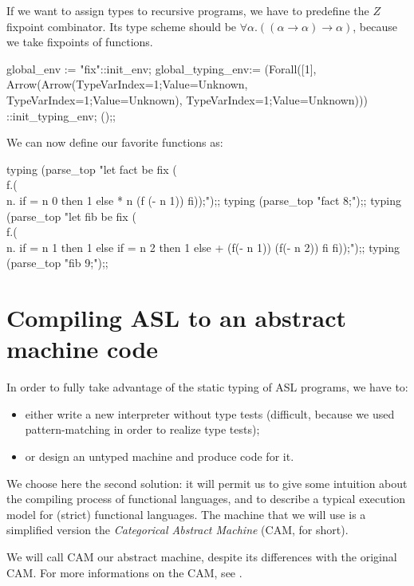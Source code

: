 If we want to assign types to recursive programs, we have to predefine
the $Z$ fixpoint combinator. Its type scheme should be
$\forall \alpha . ((\alpha \rightarrow \alpha) \rightarrow \alpha)$,
because we take fixpoints of functions.
\begin{caml_example}
global_env := "fix"::init_env;
global_typing_env:=
    (Forall([1],
     Arrow(Arrow(TypeVar{Index=1;Value=Unknown},
                   TypeVar{Index=1;Value=Unknown}),
            TypeVar{Index=1;Value=Unknown})))
   ::init_typing_env;
();;
\end{caml_example}
We can now define our favorite functions as:
\begin{caml_example}
typing (parse_top
    "let fact be fix (\\f.(\\n. if = n 0 then 1
                            else * n (f (- n 1))
                            fi));");;
typing (parse_top "fact 8;");;
typing (parse_top
  "let fib be fix (\\f.(\\n. if = n 1 then 1
                             else if = n 2 then 1
                                  else + (f(- n 1)) (f(- n 2))
                                  fi
                             fi));");;
typing (parse_top "fib 9;");;
\end{caml_example}

\chapter{Compiling ASL to an abstract machine code}
\label{c:ASLcompiling}
%

In order to fully take advantage of the static typing of ASL programs, we have
to:
\begin{itemize}
\item either write a new interpreter without type tests (difficult, because we used pattern-matching in order to realize type tests);
\item or design an untyped machine and produce code for it.
\end{itemize}
We choose here the second solution: it will permit us to give some
intuition about the compiling process of functional languages, and to
describe a typical execution model for (strict) functional languages.
The machine that we will use is a simplified version the {\em
Categorical Abstract Machine} (CAM, for short).

We will call CAM our abstract machine, despite its differences with
the original CAM. For more informations on the CAM, see
\cite{Cousineau,MaunyConfLisp}.

